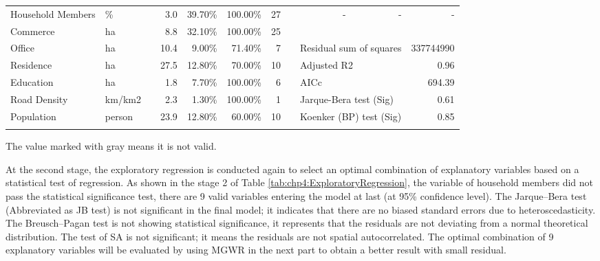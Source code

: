 \begin{sidewaystable}[htbp]
\begin{tabular}{llrrrrrcrrr}
		Household Members & \% & & 3.0 & 39.70\% & 100.00\% & 27 & & - & - & - \\
		
		\cmidrule{1-2}\cmidrule{4-7}\cmidrule{9-11}
		
		Commerce & ha & & \cellcolor[rgb]{ .8,  .8,  .8}8.8 & 32.10\% & 100.00\% & 25 & & &  \\
		
		Office & ha & & \cellcolor[rgb]{ .8,  .8,  .8}10.4 & \cellcolor[rgb]{ .8,  .8,  .8}9.00\% & \cellcolor[rgb]{ .8,  .8,  .8}71.40\% & 7 & & \multicolumn{2}{l}{Residual sum of squares} & 337744990 \\
		
		Residence & ha & & \cellcolor[rgb]{ .8,  .8,  .8}27.5 & 12.80\% & \cellcolor[rgb]{ .8,  .8,  .8}70.00\% & 10 & & \multicolumn{2}{l}{Adjusted R2} & 0.96 \\
		
		Education & ha & & 1.8 & \cellcolor[rgb]{ .8,  .8,  .8}7.70\% & 100.00\% & 6 & & \multicolumn{2}{l}{AICc} & 694.39 \\
		
		Road Density & km/km2 & & 2.3 & \cellcolor[rgb]{ .8,  .8,  .8}1.30\% & 100.00\% & 1 & & \multicolumn{2}{l}{Jarque-Bera test (Sig)} & 0.61 \\
		
		Population & person & & \cellcolor[rgb]{ .8,  .8,  .8}23.9 & 12.80\% & \cellcolor[rgb]{ .8,  .8,  .8}60.00\% & 10 & & \multicolumn{2}{l}{Koenker (BP) test (Sig)} & 0.85 \\
		
		\Xhline{1.5pt}
	\end{tabular}%
	
	\begin{description}
		\small
		\label{note:tab:chp4:ExploratoryRegression}
		\item[Note:]
		The value marked with gray means it is not valid.
	\end{description}
\end{sidewaystable}%

%
At the second stage, the exploratory regression is conducted again to select an optimal combination of explanatory variables based on a statistical test of regression. As shown in the stage 2 of Table \ref{tab:chp4:ExploratoryRegression}, the variable of household members did not pass the statistical significance test, there are 9 valid variables entering the model at last (at 95\% confidence level). The Jarque–Bera test (Abbreviated as JB test) is not significant in the final model; it indicates that there are no biased standard errors due to heteroscedasticity. The Breusch–Pagan test is not showing statistical significance, it represents that the residuals are not deviating from a normal theoretical distribution. The test of SA is not significant; it means the residuals are not spatial autocorrelated. The optimal combination of 9 explanatory variables will be evaluated by using MGWR in the next part to obtain a better result with small residual.

